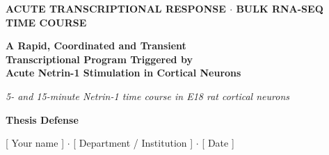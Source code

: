 \documentclass[aspectratio=169,11pt]{beamer}
\begin{document}
{
\begin{frame}[plain]
  \vskip1.2cm
  {\color{teal!50!white}\small\bfseries ACUTE TRANSCRIPTIONAL RESPONSE $\cdot$ BULK RNA-SEQ TIME COURSE}\par
  \vskip10pt
  {\color{white}\Large\bfseries A Rapid, Coordinated and Transient\\[2pt]
   Transcriptional Program Triggered by\\[2pt]
   \color{teal!70!white}Acute Netrin-1 Stimulation in Cortical Neurons}\par
  \vskip28pt
  {\color{white!85!navy}\itshape 5- and 15-minute Netrin-1 time course in E18 rat cortical neurons}\par
  \vskip22pt
  {\color{white}\small\bfseries Thesis Defense}\par
  {\color{white!60!navy}\footnotesize [ Your name ] $\cdot$ [ Department / Institution ] $\cdot$ [ Date ]}\par
\end{frame}}
\end{document}
